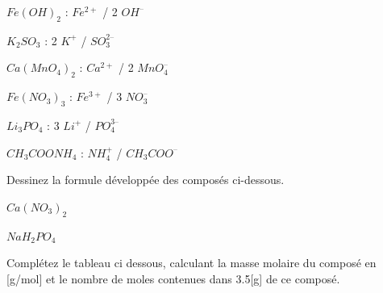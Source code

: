 \documentclass[
  11pt,
  a4paper,
  openany]{book}
\begin{document}
\begin{Answer}

\begin{multicols}{2}
\(Fe(OH)_2\) : \(Fe^{2+}\) / 2 \(OH^–\)

\(K_2SO_3\) : 2 \(K^+\) / \(SO_3^{2–}\)

\(Ca(MnO_4)_2\) : \(Ca^{2+}\) / 2 \(MnO_4^–\)

\(Fe(NO_3)_3\) : \(Fe^{3+}\) / 3 \(NO_3^–\)

\(Li_3PO_4\) : 3 \(Li^+\) / \(PO_4^{3–}\)

\(CH_3COONH_4\) : \(NH_4^+\) / \(CH_3COO^–\)

\end{multicols}

\newpage

\end{Answer}

\begin{Exercise}

Dessinez la formule développée des composés ci-dessous.

\begin{multicols}{2}
\(Ca(NO_3)_2\)

\(NaH_2PO_4\)

\end{multicols}


\end{Exercise}

\begin{Exercise}
Complétez le tableau ci dessous, calculant la masse molaire du composé en {[}g/mol{]} et le nombre de moles contenues dans 3.5{[}g{]} de ce composé.

\end{Exercise}
\end{document}
